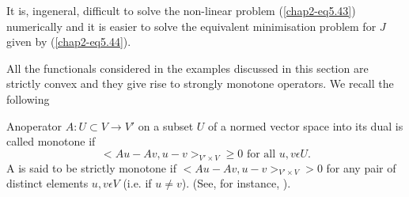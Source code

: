 \begin{remark}\label{chap2-rem5.3}
It is, ingeneral, difficult to solve the non-linear problem (\ref{chap2-eq5.43}) numerically and it is easier to solve the equivalent minimisation problem for $J$ given by (\ref{chap2-eq5.44}).
\end{remark}

\begin{remark}\label{chap2-rem5.4}
All the functionals considered in the examples discussed in this section are strictly convex and they give rise to strongly monotone operators. We recall the following
\end{remark}

\begin{definition}
An\pageoriginale operator $A : U \subset V \to V'$ on a subset $U$ of a normed vector space into its dual is called monotone if
$$
<Au - Av, u-v>_{V' \times V} \geq 0 \text{ for all } u, v \epsilon U.
$$
A is said to be strictly monotone if $<Au - Av, u-v>_{V' \times V} > 0$ for any pair of distinct elements $u, v \epsilon V$ (i.e. if $u \neq v$). (See, for instance, \cite{key44}).
\end{definition}
